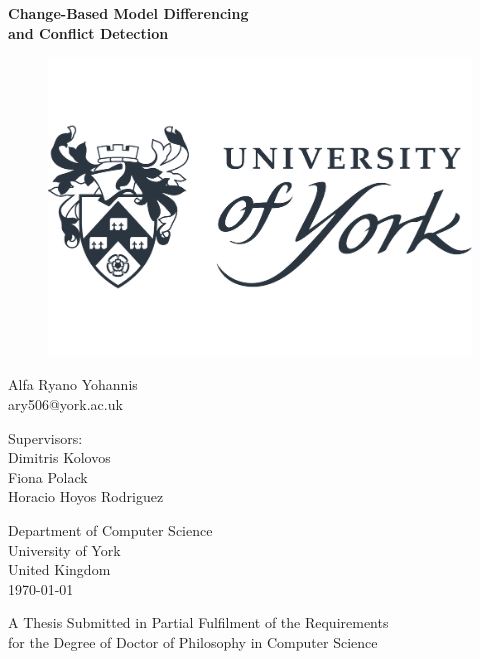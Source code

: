 \documentclass[11pt, a4paper]{report} \usepackage[titletoc]{appendix}
\begin{document}
  
  \begin{titlepage}
    \begin{center}
      
      \textbf{\Large Change-Based Model Differencing\\and Conflict Detection}
      
      \vfill
      \begin{figure}[ht]
        \centering
        \includegraphics[width=0.5\linewidth]{uoy}
        \label{fig:uoy}
      \end{figure}
      \vfill
      
      Alfa Ryano Yohannis\\
      ary506@york.ac.uk
      
      \vspace{1cm}
      
      Supervisors:\\
      Dimitris Kolovos\\
      Fiona Polack\\
      Horacio Hoyos Rodriguez
      \vspace{1cm}
      
      Department of Computer Science\\
      University of York\\
      United Kingdom\\
      \vspace{1cm}
      \today
      
      \vfill
      A Thesis Submitted in Partial Fulfilment of the Requirements\\
      for the Degree of Doctor of Philosophy in Computer Science
      
    \end{center}
  \end{titlepage}
  
\end{document}

